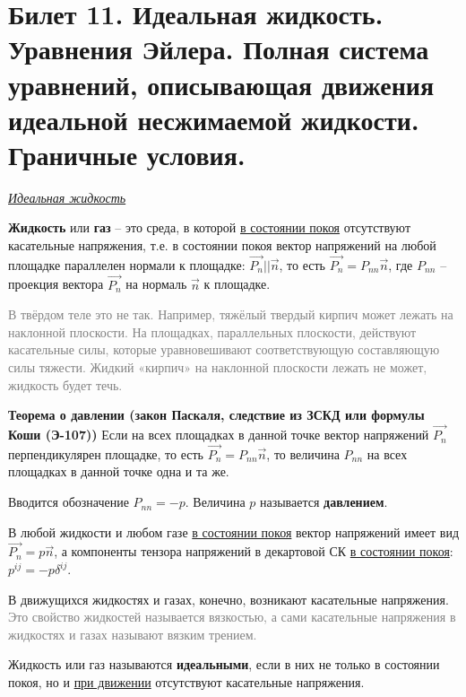\newpage
\section{Билет 11. Идеальная жидкость. Уравнения Эйлера. Полная система уравнений, описывающая движения идеальной несжимаемой жидкости. Граничные условия.}

\begin{center} \textit{\underline{Идеальная жидкость}} \end{center}

\begin{defn}[]\textbf{Жидкость} или \textbf{газ} -- это среда, в которой \underline{в состоянии покоя} отсутствуют касательные напряжения, т.е. в состоянии покоя вектор напряжений на любой площадке параллелен нормали к площадке: $ \vec{P_n} || \vec{n} $, то есть $ \vec{P_n} = P_{nn} \vec{n} $, где $ P_{nn} $ -- проекция вектора $ \vec{P_n} $ на нормаль $ \vec{n} $ к площадке.
\end{defn}

\textcolor{gray}{В твёрдом теле это не так. Например, тяжёлый твердый кирпич может лежать на наклонной плоскости. На площадках, параллельных плоскости, действуют касательные силы, которые уравновешивают соответствующую составляющую силы тяжести. Жидкий «кирпич» на наклонной плоскости лежать не может, жидкость будет течь.} 

\begin{theorem}[Э-124] \textbf{Теорема о давлении (закон Паскаля, следствие из ЗСКД или формулы Коши (Э-107))}
Если на всех площадках в данной точке вектор напряжений $ \vec{P_n} $ перпендикулярен площадке, то есть $ \vec{P_n} = P_{nn} \vec{n} $, то величина $ P_{nn} $ на всех площадках в данной точке одна и та же. 
\end{theorem}

Вводится обозначение $P_{nn} = -p$. Величина $p$ называется \textbf{давлением}.

В любой жидкости и любом газе \underline{в состоянии покоя} вектор напряжений имеет вид $ \vec{P_n} = p \vec{n} $, а компоненты тензора напряжений в декартовой СК \underline{в состоянии покоя}: $ p^{ij} = -p \delta^{ij} $.

В движущихся жидкостях и газах, конечно, возникают касательные напряжения.
\textcolor{gray}{Это свойство жидкостей называется вязкостью, а сами касательные напряжения в жидкостях и газах называют вязким трением.}

\begin{defn}[Э-125] Жидкость или газ называются \textbf{идеальными}, если в них не только в состоянии покоя, но и \underline{при движении} отсутствуют касательные напряжения.
\end{defn}

